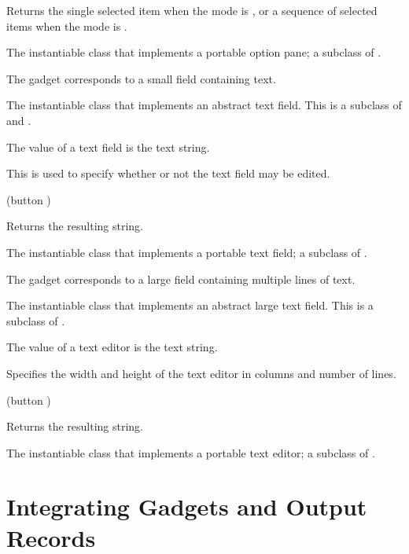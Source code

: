 Returns the single selected item when the mode is , or a sequence
of selected items when the mode is .


The instantiable class that implements a portable option pane; a subclass of
.



The  gadget corresponds to a small field containing text.


The instantiable class that implements an abstract text field.  This is a subclass of
 and .

The value of a text field is the text string.  


This is used to specify whether or not the text field may be edited.

 {(button )}

Returns the resulting string.


The instantiable class that implements a portable text field; a subclass of
.



The  gadget corresponds to a large field containing multiple
lines of text.


The instantiable class that implements an abstract large text field.  This is a
subclass of .

The value of a text editor is the text string.  


Specifies the width and height of the text editor in columns and number of lines.

 {(button )}

Returns the resulting string.


The instantiable class that implements a portable text editor; a subclass of
.


\section {Integrating Gadgets and Output Records}

